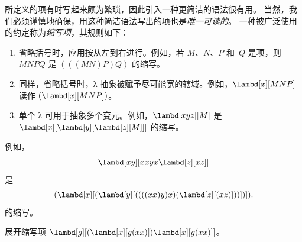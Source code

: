\documentclass[../../../include/open-logic-section]{subfiles}
\begin{document}

 所定义的项有时写起来颇为繁琐，因此引入一种更简洁的语法很有用。
当然，我们必须谨慎地确保，用这种简洁语法写出的项也是\emph{唯一可读的}。
一种被广泛使用的约定称为\emph{缩写项}，其规则如下：

\begin{enumerate}
\item 省略括号时，应用按从左到右进行。例如，若 $M$、$N$、$P$ 和~$Q$ 是项，则
  $MNPQ$ 是 $(((MN)P)Q)$ 的缩写。
\item 同样，省略括号时，λ 抽象被赋予尽可能宽的辖域。例如，$\lambd[x][MNP]$ 读作
  $(\lambd[x][MNP])$。
\item 单个 λ 可用于抽象多个变元。例如，$\lambd[xyz][M]$ 是
  $\lambd[x][\lambd[y][\lambd[z][M]]]$ 的缩写。
\end{enumerate}

例如，
\[
\lambd[xy][xxyx \lambd[z][xz]]
\]
是
\[
(\lambd[x][(\lambd[y][((((xx)y)x)(\lambd[z][(xz)]))])]).
\]
的缩写。

\begin{prob}
展开缩写项 $\lambd[g][(\lambd[x][g (x x)])
  \lambd[x][g (x x)]]$。
\end{prob}
\end{document}
